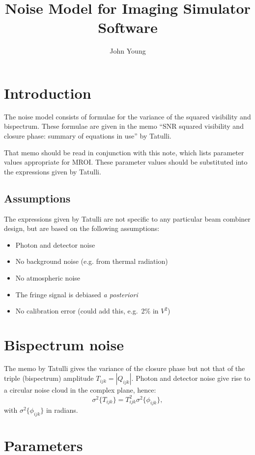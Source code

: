 \documentclass{article}
\title{Noise Model for Imaging Simulator Software}
\author{John Young}
\begin{document}
\maketitle

\section{Introduction}

The noise model consists of formulae for the variance of the
squared visibility and bispectrum. These formulae are given in the
memo ``SNR squared visibility and closure phase: summary of equations
in use'' by Tatulli.

That memo should be read in conjunction with this note, which lists
parameter values appropriate for MROI. These parameter values should
be substituted into the expressions given by Tatulli.

\subsection{Assumptions}

The expressions given by Tatulli are not specific to any particular
beam combiner design, but are based on the following assumptions:
\begin{itemize}
\item Photon and detector noise
\item No background noise (e.g. from thermal radiation)
\item No atmospheric noise
\item The fringe signal is debiased \emph{a posteriori}
\item No calibration error (could add this, e.g.\ 2\% in $V^2$)
\end{itemize}

\section{Bispectrum noise}

The memo by Tatulli gives the variance of the closure phase but not
that of the triple (bispectrum) amplitude $T_{ijk} = |Q_{ijk}|$. Photon and
detector noise give rise to a circular noise cloud in the complex
plane, hence:
\begin{equation}
\sigma^2\{T_{ijk}\} = T^2_{ijk} \sigma^2\{\phi_{ijk}\} ,
\end{equation}
with $\sigma^2\{\phi_{ijk}\}$ in radians.

\section{Parameters}
\end{document}
